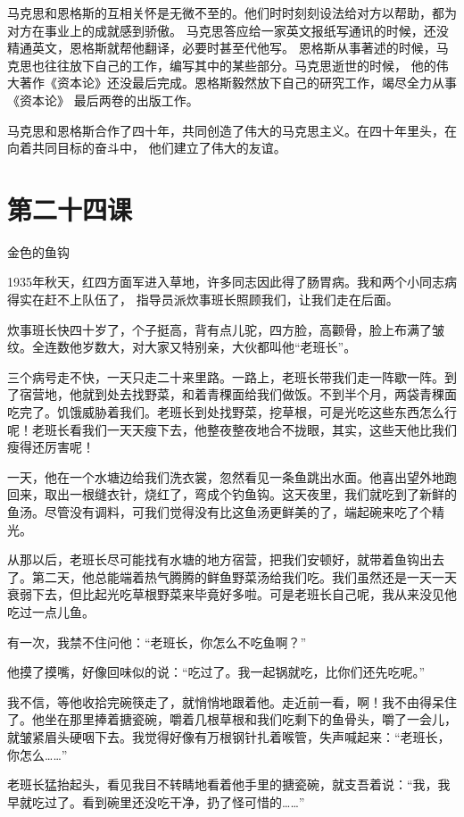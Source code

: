 \documentclass[12pt,UTF8]{ctexbook}
\begin{document}
马克思和恩格斯的互相关怀是无微不至的。他们时时刻刻设法给对方以帮助，都为对方在事业上的成就感到骄傲。
马克思答应给一家英文报纸写通讯的时候，还没精通英文，恩格斯就帮他翻译，必要时甚至代他写。
恩格斯从事著述的时候，马克思也往往放下自己的工作，编写其中的某些部分。马克思逝世的时候，
他的伟大著作《资本论》还没最后完成。恩格斯毅然放下自己的研究工作，竭尽全力从事《资本论》
最后两卷的出版工作。

马克思和恩格斯合作了四十年，共同创造了伟大的马克思主义。在四十年里头，在向着共同目标的奋斗中，
他们建立了伟大的友谊。

\section{第二十四课}

金色的鱼钩

1935年秋天，红四方面军进入草地，许多同志因此得了肠胃病。我和两个小同志病得实在赶不上队伍了，
指导员派炊事班长照顾我们，让我们走在后面。

炊事班长快四十岁了，个子挺高，背有点儿驼，四方脸，高颧骨，脸上布满了皱纹。全连数他岁数大，对大家又特别亲，大伙都叫他“老班长”。

三个病号走不快，一天只走二十来里路。一路上，老班长带我们走一阵歇一阵。到了宿营地，他就到处去找野菜，和着青稞面给我们做饭。不到半个月，两袋青稞面吃完了。饥饿威胁着我们。老班长到处找野菜，挖草根，可是光吃这些东西怎么行呢！老班长看我们一天天瘦下去，他整夜整夜地合不拢眼，其实，这些天他比我们瘦得还厉害呢！

一天，他在一个水塘边给我们洗衣裳，忽然看见一条鱼跳出水面。他喜出望外地跑回来，取出一根缝衣针，烧红了，弯成个钓鱼钩。这天夜里，我们就吃到了新鲜的鱼汤。尽管没有调料，可我们觉得没有比这鱼汤更鲜美的了，端起碗来吃了个精光。

从那以后，老班长尽可能找有水塘的地方宿营，把我们安顿好，就带着鱼钩出去了。第二天，他总能端着热气腾腾的鲜鱼野菜汤给我们吃。我们虽然还是一天一天衰弱下去，但比起光吃草根野菜来毕竟好多啦。可是老班长自己呢，我从来没见他吃过一点儿鱼。

有一次，我禁不住问他：“老班长，你怎么不吃鱼啊？”

他摸了摸嘴，好像回味似的说：“吃过了。我一起锅就吃，比你们还先吃呢。”

我不信，等他收拾完碗筷走了，就悄悄地跟着他。走近前一看，啊！我不由得呆住了。他坐在那里捧着搪瓷碗，嚼着几根草根和我们吃剩下的鱼骨头，嚼了一会儿，就皱紧眉头硬咽下去。我觉得好像有万根钢针扎着喉管，失声喊起来：“老班长，你怎么……”

老班长猛抬起头，看见我目不转睛地看着他手里的搪瓷碗，就支吾着说：“我，我早就吃过了。看到碗里还没吃干净，扔了怪可惜的……”
\end{document}
